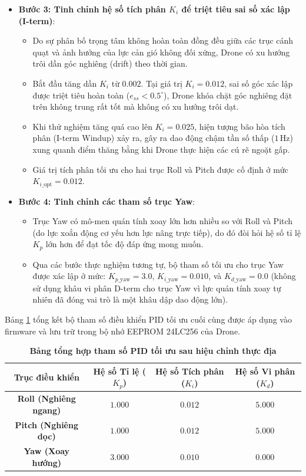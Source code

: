 \begin{itemize}
    \item \textbf{Bước 3: Tinh chỉnh hệ số tích phân $K_i$ để triệt tiêu sai số xác lập (I-term)}:
    \begin{itemize}
        \item Do sự phân bố trọng tâm không hoàn toàn đồng đều giữa các trục cánh quạt và ảnh hưởng của lực cản gió không đối xứng, Drone có xu hướng trôi dần góc nghiêng (drift) theo thời gian.
        \item Bắt đầu tăng dần $K_i$ từ $0.002$. Tại giá trị $K_i = 0.012$, sai số góc xác lập được triệt tiêu hoàn toàn ($e_{ss} < 0.5^\circ$), Drone khóa chặt góc nghiêng đặt trên không trung rất tốt mà không có xu hướng trôi dạt.
        \item Khi thử nghiệm tăng quá cao lên $K_i = 0.025$, hiện tượng bão hòa tích phân (I-term Windup) xảy ra, gây ra dao động chậm tần số thấp ($1\,\text{Hz}$) xung quanh điểm thăng bằng khi Drone thực hiện các cú rẽ ngoặt gấp.
        \item Giá trị tích phân tối ưu cho hai trục Roll và Pitch được cố định ở mức $K_{i\_\text{opt}} = 0.012$.
    \end{itemize}

    \item \textbf{Bước 4: Tinh chỉnh các tham số trục Yaw}:
    \begin{itemize}
        \item Trục Yaw có mô-men quán tính xoay lớn hơn nhiều so với Roll và Pitch (do lực xoắn động cơ yếu hơn lực nâng trực tiếp), do đó đòi hỏi hệ số tỉ lệ $K_p$ lớn hơn để đạt tốc độ đáp ứng mong muốn.
        \item Qua các bước thực nghiệm tương tự, bộ tham số tối ưu cho trục Yaw được xác lập ở mức: $K_{p\_\text{yaw}} = 3.0$, $K_{i\_\text{yaw}} = 0.010$, và $K_{d\_\text{yaw}} = 0.0$ (không sử dụng khâu vi phân D-term cho trục Yaw vì lực quán tính xoay tự nhiên đã đóng vai trò là một khâu dập dao động lớn).
    \end{itemize}
\end{itemize}

Bảng \ref{tab:pid_gains_final} tổng kết bộ tham số điều khiển PID tối ưu cuối cùng được áp dụng vào firmware và lưu trữ trong bộ nhớ EEPROM 24LC256 của Drone.

\begin{table}[H]
\centering
\caption[Bảng tổng hợp tham số PID tối ưu sau hiệu chỉnh thực địa]{\bfseries\fontsize{12pt}{0pt}\selectfont Bảng tổng hợp tham số PID tối ưu sau hiệu chỉnh thực địa}
\label{tab:pid_gains_final}
\fontsize{10pt}{12pt}\selectfont
\begin{tabular}{|c|c|c|c|}
\hline
\textbf{Trục điều khiển} & \textbf{Hệ số Tỉ lệ ($K_p$)} & \textbf{Hệ số Tích phân ($K_i$)} & \textbf{Hệ số Vi phân ($K_d$)} \\ \hline
\textbf{Roll (Nghiêng ngang)} & $1.000$ & $0.012$ & $5.000$ \\ \hline
\textbf{Pitch (Nghiêng dọc)} & $1.000$ & $0.012$ & $5.000$ \\ \hline
\textbf{Yaw (Xoay hướng)} & $3.000$ & $0.010$ & $0.000$ \\ \hline
\end{tabular}
\end{table}

